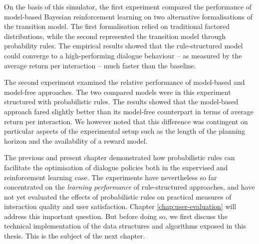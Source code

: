 On the basis of this simulator, the first experiment compared the performance of model-based Bayesian reinforcement learning on two alternative formalisations of the transition model.  The first formalisation relied on traditional factored distributions, while the second represented the transition model through probability rules. The empirical results showed that the rule-structured model could converge to a high-performing dialogue behaviour -- as measured by the average return per interaction -- much faster than the baseline.

The second experiment examined the relative performance of model-based and model-free approaches.  The two compared models were in this experiment structured with probabilistic rules. The results showed that the model-based approach fared slightly better than its model-free counterpart in terms of average return per interaction.  We however noted that this difference was contingent on particular aspects of the experimental setup such as the length of the planning horizon and the availability of a reward model. 

The previous and present chapter demonstrated how probabilistic rules can facilitate the optimisation of dialogue policies both in the supervised and reinforcement learning case. The experiments have nevertheless so far concentrated on the \textit{learning performance} of rule-structured approaches, and have not yet evaluated the effects of probabilistic rules on practical measures of interaction quality and user satisfaction. Chapter \ref{chap:user-evaluation} will address this important question. But before doing so, we first discuss the technical implementation of the data structures and algorithms exposed in this thesis. This is the subject of the next chapter.